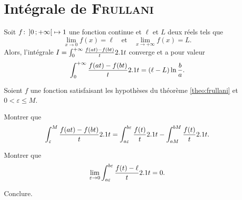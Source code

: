 \section{Intégrale de \textsc{Frullani}}




\begin{theo}\label{theo:frullani}
Soit $\fonctionligne[f]{\interoo{0}{+\infty}}{\R}$ une fonction continue et $\ell$ et $L$ deux réels tels que
\[
\lim_{x\to0} f(x) = \ell
\quad \text{et} \quad 
\lim_{x\to+\infty} f(x) = L.
\]
Alors, l'intégrale $I = \int_0^{+\infty} \frac{f(a t) - f(b t)}{t} \d t$ converge et a pour valeur
\[
\int_0^{+\infty} \frac{f(a t) - f(b t)}{t} \d t = (\ell - L) \ln\frac{b}{a}.
\]
\end{theo}

\begin{exercice}
Soient $f$ une fonction satisfaisant les hypothèses du théorème \ref{theo:frullani} et $0 < \varepsilon \leqslant M$.
\begin{questions}
\item Montrer que
\[
\int_\varepsilon^M \frac{f(a t) - f(b t)}{t} \d t
= \int_{a\varepsilon}^{b\varepsilon} \frac{f(t)}{t} \d t - \int_{a M}^{b M} \frac{f(t)}{t} \d t.
\]

\item Montrer que
\[
\lim_{\varepsilon \to 0} \int_{a\varepsilon}^{b\varepsilon} \frac{f(t) - \ell}{t} \d t = 0.
\]

\item Conclure.
\end{questions}
\end{exercice}

